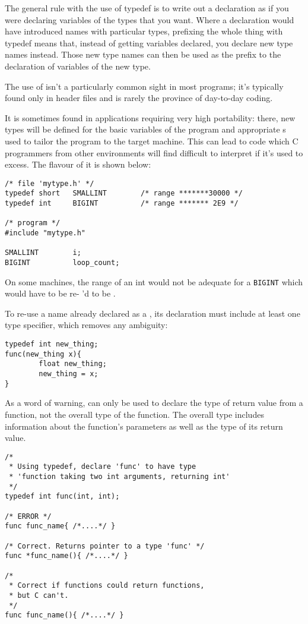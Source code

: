   The general rule with the use of typedef is to write out a declaration
   as if you were declaring variables of the types that you want. Where
   a declaration would have introduced names with particular types,
   prefixing the whole thing with typedef means that, instead of getting
   variables declared, you declare new type names instead. Those new type
   names can then be used as the prefix to the declaration of variables of
   the new type.


  The use of \typedef{} isn't a particularly common sight in
   most programs; it's typically found only in header files and is rarely
   the province of day-to-day coding.


  It is sometimes found in applications requiring very high portability:
   there, new types will be defined for the basic variables of the program
   and appropriate \typedef{}s used to tailor the program to the
   target machine. This can lead to code which C programmers from other
   environments will find difficult to interpret if it's used to excess. The
   flavour of it is shown below:


\begin{Verbatim}
/* file 'mytype.h' */
typedef short   SMALLINT        /* range *******30000 */
typedef int     BIGINT          /* range ******* 2E9 */

/* program */
#include "mytype.h"

SMALLINT        i;
BIGINT          loop_count;
\end{Verbatim}

  On some machines, the range of an int would not be adequate for
   a \texttt{BIGINT} which would have to be re- \typedef{}'d
   to be \klong.


  To re-use a name already declared as a \typedef, its
   declaration must include at least one type specifier, which removes any
   ambiguity:


\begin{Verbatim}
typedef int new_thing;
func(new_thing x){
        float new_thing;
        new_thing = x;
}
\end{Verbatim}

  As a word of warning, \typedef{} can only be used to declare
   the type of return value from a function, not the overall type of the
   function. The overall type includes information about the function's
   parameters as well as the type of its return value.


\begin{Verbatim}
/*
 * Using typedef, declare 'func' to have type
 * 'function taking two int arguments, returning int'
 */
typedef int func(int, int);

/* ERROR */
func func_name{ /*....*/ }

/* Correct. Returns pointer to a type 'func' */
func *func_name(){ /*....*/ }

/*
 * Correct if functions could return functions,
 * but C can't.
 */
func func_name(){ /*....*/ }
\end{Verbatim}

